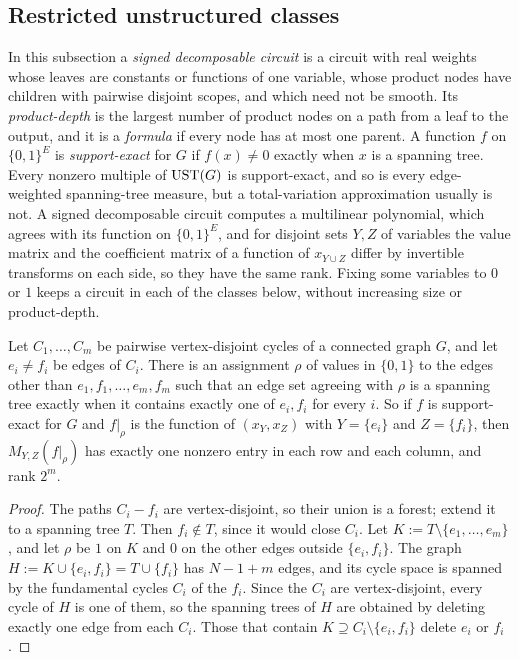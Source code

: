 \subsection{Restricted unstructured classes}\label{sec:signed-restricted}

In this subsection a \emph{signed decomposable circuit} is a circuit with real weights whose leaves are constants or functions of one variable, whose product nodes have children with pairwise disjoint scopes, and which need not be smooth. Its \emph{product-depth} is the largest number of product nodes on a path from a leaf to the output, and it is a \emph{formula} if every node has at most one parent. A function $f$ on $\{0,1\}^E$ is \emph{support-exact} for $G$ if $f(x)\ne0$ exactly when $x$ is a spanning tree. Every nonzero multiple of $\mathrm{UST}(G)$ is support-exact, and so is every edge-weighted spanning-tree measure, but a total-variation approximation usually is not. A signed decomposable circuit computes a multilinear polynomial, which agrees with its function on $\{0,1\}^E$, and for disjoint sets $Y,Z$ of variables the value matrix and the coefficient matrix of a function of $x_{Y\cup Z}$ differ by invertible transforms on each side, so they have the same rank. Fixing some variables to $0$ or $1$ keeps a circuit in each of the classes below, without increasing size or product-depth.

\begin{lemma}\label{lem:digon}
Let $C_1,\dots,C_m$ be pairwise vertex-disjoint cycles of a connected graph $G$, and let $e_i\ne f_i$ be edges of $C_i$. There is an assignment $\rho$ of values in $\{0,1\}$ to the edges other than $e_1,f_1,\dots,e_m,f_m$ such that an edge set agreeing with $\rho$ is a spanning tree exactly when it contains exactly one of $e_i,f_i$ for every $i$. So if $f$ is support-exact for $G$ and $f|_\rho$ is the function of $(x_Y,x_Z)$ with $Y=\{e_i\}$ and $Z=\{f_i\}$, then $M_{Y,Z}(f|_\rho)$ has exactly one nonzero entry in each row and each column, and rank $2^m$.
\end{lemma}

\begin{proof}
The paths $C_i-f_i$ are vertex-disjoint, so their union is a forest; extend it to a spanning tree $T$. Then $f_i\notin T$, since it would close $C_i$. Let $K:=T\setminus\{e_1,\dots,e_m\}$, and let $\rho$ be $1$ on $K$ and $0$ on the other edges outside $\{e_i,f_i\}$. The graph $H:=K\cup\{e_i,f_i\}=T\cup\{f_i\}$ has $N-1+m$ edges, and its cycle space is spanned by the fundamental cycles $C_i$ of the $f_i$. Since the $C_i$ are vertex-disjoint, every cycle of $H$ is one of them, so the spanning trees of $H$ are obtained by deleting exactly one edge from each $C_i$. Those that contain $K\supseteq C_i\setminus\{e_i,f_i\}$ delete $e_i$ or $f_i$.
\end{proof}


